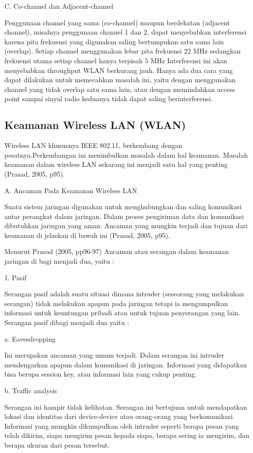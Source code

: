 \documentclass{jtetiproposalskripsi}
\begin{document}
C. Co-channel dan Adjacent-channel

	Penggunaan channel yang sama (co-channel) maupun berdekatan (adjacent channel), misalnya penggunaan channel 1 dan 2, dapat menyebabkan interferensi karena pita frekuensi yang digunakan saling bertumpukan satu sama lain (overlap). Setiap channel menggunakan lebar pita frekuensi 22 MHz sedangkan frekuensi utama setiap channel hanya terpisah 5 MHz
Interferensi ini akan menyebabkan throughput WLAN berkurang
jauh. Hanya ada dua cara yang dapat dilakukan untuk memecahkan
masalah ini, yaitu dengan menggunakan channel yang tidak overlap satu sama lain, atau dengan memindahkan access point sampai sinyal radio keduanya tidak dapat saling berinterferensi.


\subsection{Keamanan Wireless LAN (WLAN)}

	Wireless LAN khususnya IEEE 802.11, berkembang dengan pesatnya.Perkembangan ini menimbulkan masalah dalam hal keamanan. Masalah keamanan dalam wireless LAN sekarang ini menjadi satu hal yang penting (Prasad, 2005, p95).

A. Ancaman Pada Keamanan Wireless LAN

	Suatu sistem jaringan digunakan untuk menghubungkan dan saling komunikasi antar perangkat dalam jaringan. Dalam proses pengiriman data dan komunikasi dibutuhkan jaringan yang aman. Ancaman yang mungkin terjadi dan tujuan dari keamanan di jelaskan di bawah ini (Prasad, 2005, p95).

Menurut Prasad (2005, pp96-97) Ancaman atau serangan dalam keamanan jaringan di bagi menjadi dua, yaitu :

1. Pasif

Serangan pasif adalah suatu situasi dimana intruder (seseorang
yang melakukan serangan) tidak melakukan apapun pada jaringan
tetapi ia mengumpulkan informasi untuk keuntungan pribadi atau
untuk tujuan penyerangan yang lain. Serangan pasif dibagi
menjadi dua yaitu :

a. Eavesdropping

Ini merupakan ancaman yang umum terjadi. Dalam serangan ini intruder mendengarkan apapun dalam komunikasi di jaringan. Informasi yang didapatkan bisa berupa session key, atau informasi lain yang cukup penting.

b. Traffic analysis

Serangan ini hampir tidak kelihatan. Serangan ini bertujuan
untuk mendapatkan lokasi dan identitas dari device-device atau
orang-orang yang berkomunikasi. Informasi yang mungkin
dikumpulkan oleh intruder seperti berapa pesan yang telah
dikirim, siapa mengirim pesan kepada siapa, berapa sering ia
mengirim, dan berapa ukuran dari pesan tersebut.
\end{document}

